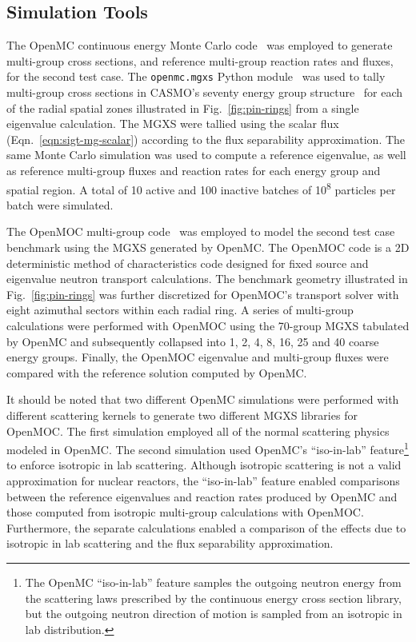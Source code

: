 \subsection{Simulation Tools}
\label{subsec:sim-tools-case2}

The OpenMC continuous energy Monte Carlo code~\citep{romano2013openmc} was employed to generate multi-group cross sections, and reference multi-group reaction rates and fluxes, for the second test case. The \texttt{openmc.mgxs} Python module~\citep{boyd2017openmcmgxs} was used to tally multi-group cross sections in CASMO's seventy energy group structure~\citep{rhodes2006casmo} for each of the radial spatial zones illustrated in Fig.~\ref{fig:pin-rings} from a single eigenvalue calculation. The MGXS were tallied using the scalar flux (Eqn.~\ref{eqn:sigt-mg-scalar}) according to the flux separability approximation. The same Monte Carlo simulation was used to compute a reference eigenvalue, as well as reference multi-group fluxes and reaction rates for each energy group and spatial region. A total of 10 active and 100 inactive batches of 10\textsuperscript{8} particles per batch were simulated. 

The OpenMOC multi-group code~\citep{boyd2014openmoc} was employed to model the second test case benchmark using the MGXS generated by OpenMC. The OpenMOC code is a 2D deterministic method of characteristics code designed for fixed source and eigenvalue neutron transport calculations. The benchmark geometry illustrated in Fig.~\ref{fig:pin-rings} was further discretized for OpenMOC's transport solver with eight azimuthal sectors within each radial ring. A series of multi-group calculations were performed with OpenMOC using the 70-group MGXS tabulated by OpenMC and subsequently collapsed into 1, 2, 4, 8, 16, 25 and 40 coarse energy groups. Finally, the OpenMOC eigenvalue and multi-group fluxes were compared with the reference solution computed by OpenMC.

It should be noted that two different OpenMC simulations were performed with different scattering kernels to generate two different MGXS libraries for OpenMOC. The first simulation employed all of the normal scattering physics modeled in OpenMC. The second simulation used OpenMC's ``iso-in-lab'' feature\footnote{The OpenMC ``iso-in-lab'' feature samples the outgoing neutron energy from the scattering laws prescribed by the continuous energy cross section library, but the outgoing neutron direction of motion is sampled from an isotropic in lab distribution.} to enforce isotropic in lab scattering. Although isotropic scattering is not a valid approximation for nuclear reactors, the ``iso-in-lab'' feature enabled comparisons between the reference eigenvalues and reaction rates produced by OpenMC and those computed from isotropic multi-group calculations with OpenMOC. Furthermore, the separate calculations enabled a comparison of the effects due to isotropic in lab scattering and the flux separability approximation.


